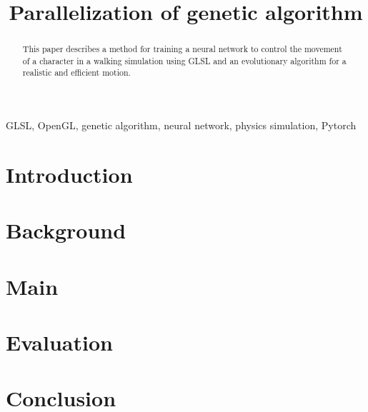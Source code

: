 \documentclass[conference]{IEEEtran}
\begin{document}
\title{Parallelization of genetic algorithm}

\author{
    \and
}


\maketitle

\begin{abstract}
     This paper describes a method for training a neural network to control the movement of a character in a walking simulation using GLSL and an evolutionary algorithm for a realistic and efficient motion.
\end{abstract}

\begin{IEEEkeywords}
    GLSL, OpenGL, genetic algorithm, neural network, physics simulation, Pytorch
\end{IEEEkeywords}

\section{\huge Introduction}
    
    
\section{\huge Background}
    
    

\section{\huge Main}
     
    

\section{\huge Evaluation}




%

\section{\huge Conclusion}





\end{document}
